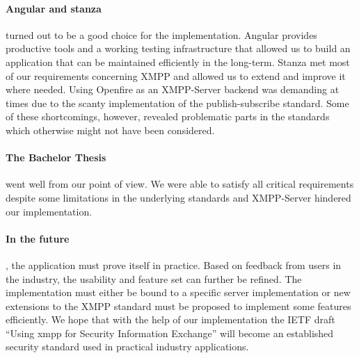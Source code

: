 \paragraph{Angular and stanza} turned out to be a good choice for the implementation.
Angular provides productive tools and a working testing infrastructure that allowed us to build an application that can be maintained efficiently in the long-term.
Stanza met most of our requirements concerning XMPP and allowed us to extend and improve it where needed.
Using Openfire as an XMPP-Server backend was demanding at times due to the scanty implementation of the \gls{publish-subscribe} standard.
Some of these shortcomings, however, revealed problematic parts in the standards which otherwise might not have been considered.

\paragraph{The Bachelor Thesis} went well from our point of view.
We were able to satisfy all critical requirements despite some limitations in the underlying standards and XMPP-Server hindered our implementation.

\paragraph{In the future}, the application must prove itself in practice.
Based on feedback from users in the industry, the usability and feature set can further be refined.
The implementation must either be bound to a specific server implementation or new extensions to the XMPP standard must be proposed to implement some features efficiently. We hope that with the help of our implementation the IETF draft ``Using \gls{xmpp} for Security Information Exchange'' will become an established security standard used in practical industry applications.
